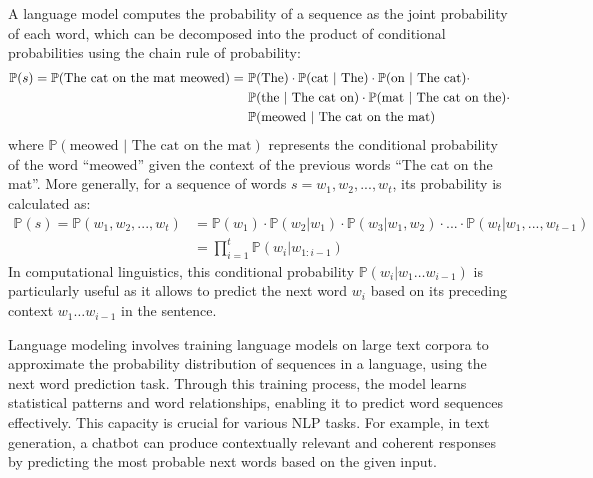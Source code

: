 A language model computes the probability of a sequence as the joint probability of each word, which can be decomposed into the product of conditional probabilities using the chain rule of probability:
\vspace{-0.5\baselineskip}
  \begin{align*}
  \mathbb{P} (s) = \mathbb{P}(\text{The cat on the mat meowed}) = \ 
& \mathbb{P}(\text{The}) \cdot  \mathbb{P}(\text{cat | The}) \cdot \mathbb{P}(\text{on | The cat}) \cdot \\
& \mathbb{P}(\text{the | The cat on}) \cdot \mathbb{P}(\text{mat | The cat on the}) \cdot \\
& \mathbb{P}(\text{meowed | The cat on the mat})
\vspace{-0.2\baselineskip}
\end{align*}
\noindent where $\mathbb{P}(\text{meowed | The cat on the mat})$ represents the conditional probability of the word ``meowed'' given the context of the previous words ``The cat on the mat''.  More generally, for a sequence of words $s = w_1, w_2, ..., w_t$, its probability is calculated as: 
\begin{align}
\mathbb{P}(s) = \mathbb{P}(w_1, w_2, ..., w_t) & = \mathbb{P}(w_1) \cdot \mathbb{P}(w_2 | w_1) \cdot \mathbb{P}(w_3 | w_1, w_2) \cdot ... \cdot \mathbb{P}(w_t | w_1, ..., w_{t-1}) \nonumber \\
&=\prod_{i=1}^{t} \mathbb{P}(w_i | w_{1:i-1})
\end{align}
\noindent
In computational linguistics, this conditional probability $\mathbb{P}(w_i|w_1\ldots
  w_{i-1})$ is particularly useful as it allows to predict the next
  word $w_i$ based on its preceding context $w_1\ldots   w_{i-1}$ in the sentence. 

Language modeling involves training language models on large text corpora to approximate the probability distribution of sequences in a language, using the next word prediction task. Through this training process, the model learns statistical patterns and word relationships, enabling it to predict word sequences effectively. This capacity is crucial for various NLP tasks. For example, in text generation, a chatbot can produce contextually relevant and coherent responses by predicting the most probable next words based on the given input. 

